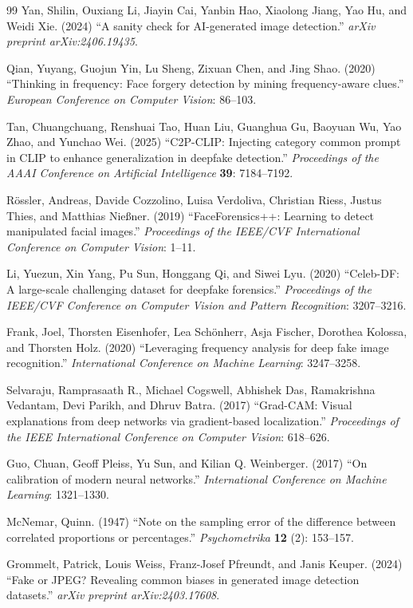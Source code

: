 \documentclass[3p,times,procedia]{elsarticle}
\begin{document}
\begin{thebibliography}{99}
Yan, Shilin, Ouxiang Li, Jiayin Cai, Yanbin Hao, Xiaolong Jiang, Yao Hu,
and Weidi Xie. (2024) ``A sanity check for AI-generated image detection.''
\textit{arXiv preprint arXiv:2406.19435}.

Qian, Yuyang, Guojun Yin, Lu Sheng, Zixuan Chen, and Jing Shao. (2020)
``Thinking in frequency: Face forgery detection by mining
frequency-aware clues.'' \textit{European Conference on Computer Vision}:
86--103.

Tan, Chuangchuang, Renshuai Tao, Huan Liu, Guanghua Gu, Baoyuan Wu, Yao
Zhao, and Yunchao Wei. (2025) ``C2P-CLIP: Injecting category common
prompt in CLIP to enhance generalization in deepfake detection.''
\textit{Proceedings of the AAAI Conference on Artificial Intelligence}
\textbf{39}: 7184--7192.

R\"{o}ssler, Andreas, Davide Cozzolino, Luisa Verdoliva, Christian Riess,
Justus Thies, and Matthias Nie{\ss}ner. (2019) ``FaceForensics++: Learning
to detect manipulated facial images.'' \textit{Proceedings of the IEEE/CVF
International Conference on Computer Vision}: 1--11.

Li, Yuezun, Xin Yang, Pu Sun, Honggang Qi, and Siwei Lyu. (2020)
``Celeb-DF: A large-scale challenging dataset for deepfake forensics.''
\textit{Proceedings of the IEEE/CVF Conference on Computer Vision and
Pattern Recognition}: 3207--3216.


Frank, Joel, Thorsten Eisenhofer, Lea Sch\"{o}nherr, Asja Fischer, Dorothea
Kolossa, and Thorsten Holz. (2020) ``Leveraging frequency analysis for deep
fake image recognition.'' \textit{International Conference on Machine
Learning}: 3247--3258.

Selvaraju, Ramprasaath R., Michael Cogswell, Abhishek Das, Ramakrishna
Vedantam, Devi Parikh, and Dhruv Batra. (2017) ``Grad-CAM: Visual
explanations from deep networks via gradient-based localization.''
\textit{Proceedings of the IEEE International Conference on Computer
Vision}: 618--626.

Guo, Chuan, Geoff Pleiss, Yu Sun, and Kilian Q. Weinberger. (2017) ``On
calibration of modern neural networks.'' \textit{International Conference
on Machine Learning}: 1321--1330.

McNemar, Quinn. (1947) ``Note on the sampling error of the difference
between correlated proportions or percentages.'' \textit{Psychometrika}
\textbf{12} (2): 153--157.

Grommelt, Patrick, Louis Weiss, Franz-Josef Pfreundt, and Janis Keuper.
(2024) ``Fake or JPEG? Revealing common biases in generated image detection
datasets.'' \textit{arXiv preprint arXiv:2403.17608}.

\end{thebibliography}
\end{document}
